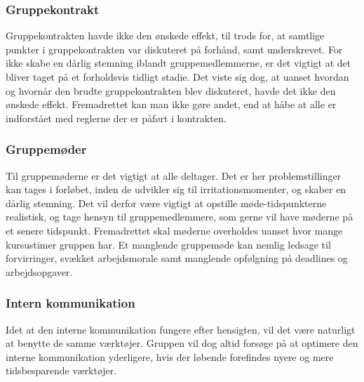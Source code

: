 \subsubsection{Gruppekontrakt}
Gruppekontrakten havde ikke den ønskede effekt, til trods for, at samtlige punkter i gruppekontrakten var diskuteret på forhånd, samt underskrevet. For ikke skabe en dårlig stemning iblandt gruppemedlemmerne, er det vigtigt at det bliver taget på et forholdsvis tidligt stadie. Det viste sig dog, at uanset hvordan og hvornår den brudte gruppekontrakten blev diskuteret, havde det ikke den ønskede effekt. Fremadrettet kan man ikke gøre andet, end at håbe at alle er indforstået med reglerne der er påført i kontrakten. \\

\subsubsection{Gruppemøder}
Til gruppemøderne er det vigtigt at alle deltager. Det er her problemstillinger kan tages i forløbet, inden de udvikler sig til irritationsmomenter, og skaber en dårlig stemning. Det vil derfor være vigtigt at opstille møde-tidspunkterne realistisk, og tage hensyn til gruppemedlemmere, som gerne vil have møderne på et senere tidspunkt. Fremadrettet skal møderne overholdes uanset hvor mange kursustimer gruppen har. Et manglende gruppemøde kan nemlig ledsage til forvirringer, svækket arbejdsmorale samt manglende opfølgning på deadlines og arbejdsopgaver. \\

\subsubsection{Intern kommunikation}
Idet at den interne kommunikation fungere efter hensigten, vil det være naturligt at benytte de samme værktøjer. Gruppen vil dog altid forsøge på at optimere den interne kommunikation yderligere, hvis der løbende forefindes nyere og mere tidsbesparende værktøjer. \\
